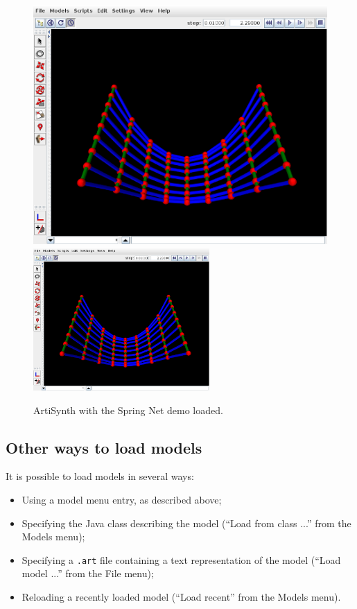\begin{figure}[ht]
\begin{center}
\iflatexml
   \includegraphics[]{images/SpringNetDemo}
\else
   \includegraphics[width=0.60\textwidth]{images/SpringNetDemo}
\fi
\end{center}
\caption{ArtiSynth with the Spring Net demo loaded.}
\label{SpringNetDemo:fig}
\end{figure}

\subsection{Other ways to load models}

It is possible to load models in several ways:

\begin{itemize}

\item Using a model menu entry, as described above;

\item Specifying the Java class describing the model
({\sf ``Load from class ...''} from the {\sf Models} menu);

\item Specifying a {\tt .art} file containing a text
representation of the model ({\sf ``Load model ...''} from the {\sf
File} menu);

\item Reloading a recently loaded model 
({\sf ``Load recent''} from the {\sf Models} menu).

\end{itemize}


